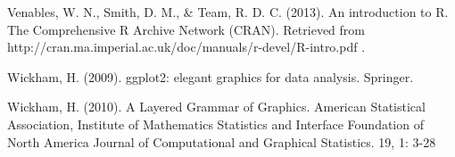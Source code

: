 \documentclass[]{article}
\newenvironment{Shaded}{}{}
\newcommand{\KeywordTok}[1]{\textcolor[rgb]{0.00,0.44,0.13}{\textbf{{#1}}}}
\newcommand{\StringTok}[1]{\textcolor[rgb]{0.25,0.44,0.63}{{#1}}}
\newcommand{\CommentTok}[1]{\textcolor[rgb]{0.38,0.63,0.69}{\textit{{#1}}}}
\newcommand{\NormalTok}[1]{{#1}}
\begin{document}
Venables, W. N., Smith, D. M., \& Team, R. D. C. (2013). An introduction
to R. The Comprehensive R Archive Network (CRAN). Retrieved from
http://cran.ma.imperial.ac.uk/doc/manuals/r-devel/R-intro.pdf .

Wickham, H. (2009). ggplot2: elegant graphics for data analysis.
Springer.

Wickham, H. (2010). A Layered Grammar of Graphics. American Statistical
Association, Institute of Mathematics Statistics and Interface
Foundation of North America Journal of Computational and Graphical
Statistics. 19, 1: 3-28

\end{document}
